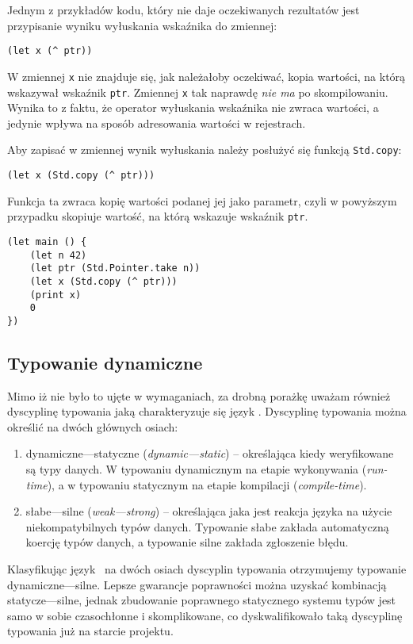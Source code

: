 Jednym z przykładów kodu, który nie daje oczekiwanych rezultatów jest
przypisanie wyniku wyłuskania wskaźnika do zmiennej:
\begin{lstlisting}
(let x (^ ptr))
\end{lstlisting}
W zmiennej \texttt{x} nie znajduje się, jak należałoby oczekiwać, kopia
wartości, na którą wskazywał wskaźnik \texttt{ptr}. Zmiennej \texttt{x} tak
naprawdę \emph{nie ma} po skompilowaniu. Wynika to z faktu, że operator
wyłuskania wskaźnika nie zwraca wartości, a jedynie wpływa na sposób adresowania
wartości w rejestrach.

Aby zapisać w zmiennej wynik wyłuskania należy posłużyć się funkcją
\texttt{Std.copy}:
\begin{lstlisting}
(let x (Std.copy (^ ptr)))
\end{lstlisting}
Funkcja ta zwraca kopię wartości podanej jej jako parametr, czyli w powyższym
przypadku skopiuje wartość, na którą wskazuje wskaźnik \texttt{ptr}.

\begin{lstlisting}[caption={Poprawnie działający przykład dowiązania do wyłuskania}]
(let main () {
    (let n 42)
    (let ptr (Std.Pointer.take n))
    (let x (Std.copy (^ ptr)))
    (print x)
    0
})
\end{lstlisting}

\subsection{Typowanie dynamiczne}

Mimo iż nie było to ujęte w wymaganiach, za drobną porażkę uważam również
dyscyplinę typowania jaką charakteryzuje się język \ViuAct. Dyscyplinę typowania
można określić na dwóch głównych osiach:
\begin{enumerate}
\item dynamiczne---statyczne (\emph{dynamic---static}) -- określająca kiedy
    weryfikowane są typy danych. W typowaniu dynamicznym na etapie wykonywania
    (\emph{run-time}), a w typowaniu statycznym na etapie kompilacji
    (\emph{compile-time}).
\item słabe---silne (\emph{weak---strong}) -- określająca jaka jest reakcja
    języka na użycie niekompatybilnych typów danych. Typowanie słabe zakłada
    automatyczną koercję typów danych, a typowanie silne zakłada zgłoszenie
    błędu.
\end{enumerate}

Klasyfikując język \ViuAct\ na dwóch osiach dyscyplin typowania
otrzymujemy typowanie dynamiczne---silne. Lepsze gwarancje poprawności można
uzyskać kombinacją statycze---silne, jednak zbudowanie poprawnego statycznego
systemu typów jest samo w sobie czasochłonne i skomplikowane, co
dyskwalifikowało taką dyscyplinę typowania już na starcie projektu.

